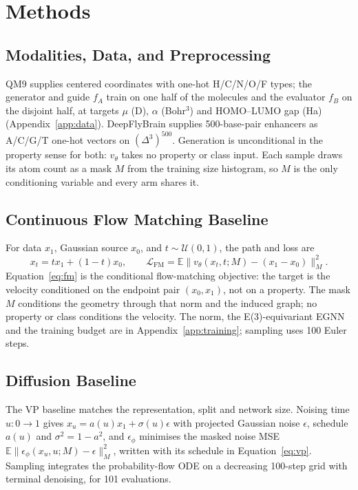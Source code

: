 \documentclass{article}
\begin{document}
\section{Methods}
\subsection{Modalities, Data, and Preprocessing}\label{sec:data}
QM9 \citep{ramakrishnan2014qm9} supplies centered coordinates with one-hot H/C/N/O/F types; the generator and guide $f_A$ train on one half of the molecules and the evaluator $f_B$ on the disjoint half, at targets $\mu$ (D), $\alpha$ (Bohr$^3$) and HOMO--LUMO gap (Ha) (Appendix~\ref{app:data}). DeepFlyBrain \citep{stark2024dirichlet} supplies 500-base-pair enhancers as A/C/G/T one-hot vectors on $(\Delta^3)^{500}$. Generation is unconditional in the property sense for both: $v_\theta$ takes no property or class input. Each sample draws its atom count as a mask $M$ from the training size histogram, so $M$ is the only conditioning variable and every arm shares it.

\subsection{Continuous Flow Matching Baseline}\label{sec:fm}
For data $x_1$, Gaussian source $x_0$, and $t\sim\mathcal U(0,1)$, the path and loss are
\begin{equation}
x_t=t x_1+(1-t)x_0,\qquad
\mathcal L_{\mathrm{FM}}=\mathbb E\|v_\theta(x_t,t;M)-(x_1-x_0)\|_M^2.
\label{eq:fm}
\end{equation}
Equation~\eqref{eq:fm} is the conditional flow-matching objective: the target is the velocity conditioned on the endpoint pair $(x_0,x_1)$, not on a property. The mask $M$ conditions the geometry through that norm and the induced graph; no property or class conditions the velocity. The norm, the E(3)-equivariant EGNN and the training budget are in Appendix~\ref{app:training}; sampling uses 100 Euler steps.

\subsection{Diffusion Baseline}\label{sec:diff}
The VP baseline matches the representation, split and network size. Noising time $u:0\to1$ gives $x_u=a(u)x_1+\sigma(u)\epsilon$ with projected Gaussian noise $\epsilon$, schedule $a(u)$ and $\sigma^2=1-a^2$, and $\epsilon_\phi$ minimises the masked noise MSE $\mathbb{E}\|\epsilon_\phi(x_u,u;M)-\epsilon\|_M^2$, written with its schedule in Equation~\eqref{eq:vp}. Sampling integrates the probability-flow ODE on a decreasing 100-step grid with terminal denoising, for 101 evaluations.
\end{document}
